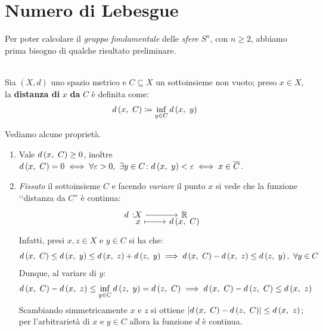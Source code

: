 \section{Numero di Lebesgue}
Per poter calcolare il \textit{gruppo fondamentale} delle \textit{sfere} $S^n$, con $n\geq 2$, abbiamo prima bisogno di qualche risultato preliminare.
\begin{define}~{}\\
Sia $\left(X, d\right)$ uno spazio metrico e $C\subseteq X$ un sottoinsieme non vuoto; preso $x\in X$, la \textbf{distanza di} $x$ \textbf{da} $C$ è definita come:
\begin{equation}
	d\left(x,\ C\right)\coloneqq \inf_{y\in C} d\left(x,\ y\right)
\end{equation}
\vspace{-6mm}
\end{define}
Vediamo alcune proprietà.
\begin{enumerate}
	\item Vale $d\left(x,\ C\right)\geq 0$, inoltre $d\left(x,\ C\right)=0 \iff \forall\varepsilon >0,\ \exists y\in C \colon d\left(x,\ y\right)<\varepsilon \iff x\in\overline{C}$.
	\item \textit{Fissato} il sottoinsieme $C$ e facendo \textit{variare} il punto $x$ si vede che la funzione ‘‘distanza da $C$'' è continua:
	\begin{equation*}
		\funztot d X \realset x {\mvf{d}{x}{C}}
	\end{equation*}
	Infatti, presi $x,z\in X$ e $y\in C$ si ha che:
	\begin{equation*}
		d\left(x,\ C\right)\leq d\left(x,\ y\right) \leq d\left(x,\ z\right) + d\left(z,\ y\right) \implies d\left(x,\ C\right) - d\left(x,\ z\right) \leq d\left(z,\ y\right),\ \forall y\in C
		\end{equation*}
	Dunque, al variare di $y$:
		\begin{equation*}
		d\left(x,\ C\right) - d\left(x,\ z\right) \leq \inf_{y\in C} d\left(z,\ y\right) = d\left(z,\ C\right) \implies d\left(x,\ C\right) - d\left(z,\ C\right) \leq d\left(x,\ z\right)
	\end{equation*}
	Scambiando simmetricamente $x$ e $z$ si ottiene  $\lvert d\left(x,\ C\right) - d\left(z,\ C\right) \rvert \leq d\left(x,\ z\right)$; per l'arbitrarietà di $x$ e $y\in C$ allora la funzione $d$ è continua.
\end{enumerate}

